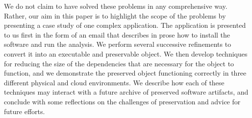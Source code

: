 We do not claim to have solved these problems in any comprehensive
way.  Rather, our aim in this paper is to highlight the scope
of the problems by presenting a case study of one complex application.
The application is presented to us
first in the form of an email that describes in prose how to install
the software and run the analysis.  We perform several successive
refinements to convert it into an executable and preservable object.
We then develop techniques for reducing the size of the dependencies
that are necessary for the object to function, and we demonstrate
the preserved object functioning correctly in three different
physical and cloud environments.
We describe how each of these techniques may interact with
a future archive of preserved software artifacts, and conclude with
some reflections on the challenges of preservation and advice for future efforts.

